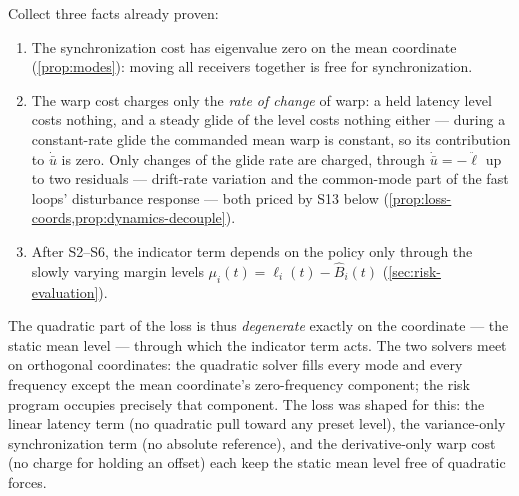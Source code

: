 \documentclass[11pt, a4paper]{article}
\theoremstyle{definition}
\theoremstyle{plain}
\theoremstyle{remark}
\begin{document}
Collect three facts already proven:
\begin{enumerate}[label=(F\arabic*)]
  \item The synchronization cost has eigenvalue zero on the mean
    coordinate (\cref{prop:modes}): moving all receivers together is
    free for synchronization.
  \item The warp cost charges only the \emph{rate of change} of warp:
    a held latency level costs nothing, and a steady glide of the level
    costs nothing either --- during a constant-rate glide the
    commanded mean warp is constant, so its contribution to
    $\dot{\bar u}$ is zero.  Only changes of the glide rate are
    charged, through $\dot{\bar u} = -\ddot\ell$ up to two residuals
    --- drift-rate variation and the common-mode part of the fast
    loops' disturbance response --- both priced by S13 below
    (\cref{prop:loss-coords,prop:dynamics-decouple}).
  \item After S2--S6, the indicator term depends on the policy only
    through the slowly varying margin levels
    $\mu_i(t) = \ell_i(t) - \hat B_i(t)$
    (\cref{sec:risk-evaluation}).
\end{enumerate}
The quadratic part of the loss is thus \emph{degenerate} exactly on the
coordinate --- the static mean level --- through which the indicator
term acts.  The two solvers meet on orthogonal coordinates: the
quadratic solver fills every mode and every frequency except the mean
coordinate's zero-frequency component; the risk program occupies
precisely that component.  The loss was shaped for this: the linear
latency term (no quadratic pull toward any preset level), the
variance-only synchronization term (no absolute reference), and the
derivative-only warp cost (no charge for holding an offset) each keep
the static mean level free of quadratic forces.
\end{document}
